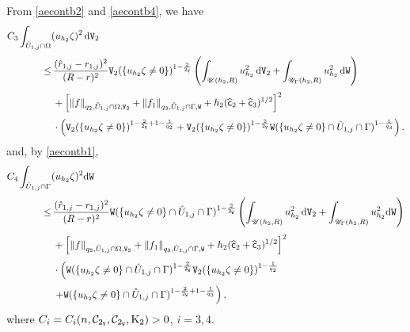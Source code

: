 \documentclass[reqno, 11pt, a4paper]{amsart}
\numberwithin{equation}{section}
\newcommand{\xv}{2_{\mathtt{V}}}
\newcommand{\xw}{2_{\mathtt{W}}}
\newcommand{\ck}{\textnormal K}
\newcommand{\fc}{\mathsf c}
\newcommand{\wghtv}{\mathtt{V}}
\newcommand{\wghtw}{\mathtt{W}}
\newcommand{\dwv}{\textnormal{d} \mathtt{V}}
\newcommand{\dww}{\textnormal{d} \mathtt{W}}
\begin{document}
From   \eqref{aecontb2} and   \eqref{aecontb4}, we have
\begin{equation}\label{aecontb6}
\begin{split} 
C_{3} \int   _{\hat U _{1,j} \cap \Omega } &    (u_{h_{2}}  \zeta )^2 \, \dwv _{2}   \\[3pt]
 \leq & \displaystyle \,    \frac{ (\hat r _{1,j} - r_{1,j})^2}{(R-r) ^{2}} \wghtv _2 ( \{u_{h_{2}}  \zeta \neq 0\})^{1- \frac{2}{\xv}}  \left( \int _{\mathscr{U}(h_{2},R)} u_{h_{2}}  ^2 \, \dwv _{2}    + \int _{\mathscr{U} _{\Gamma } (h_{2},R)}  u_{h_{2}}  ^2 \, \dww   \right)   \\[3pt]
 & \displaystyle \, + \left[  \Vert f \Vert _{q_2 , \hat U _{1,j} \cap \Omega  , \wghtv _2 } + \Vert f_1 \Vert _{q_3 , \hat U _{1,j} \cap \Gamma , \wghtw } + h_{2} (\widehat{\fc}_2+\widehat{\fc}_3 )^{1/2} \right]^2 \\[3pt]
& \displaystyle \,  \cdot   \left( \wghtv _2 ( \{u_{h_{2}}  \zeta \neq 0\})^{1- \frac{2}{\xv} + 1 -\frac{1}{q_2} }  + \wghtv _2 ( \{u_{h_{2}}  \zeta \neq 0\})^{1- \frac{2}{\xv}}  \wghtw  ( \{ u_{h_{2}}  \zeta \neq 0\}\cap \hat U _{1,j} \cap \Gamma )^{1-\frac{1}{q_3}} \right) .
\end{split}
\end{equation}
and, by \eqref{aecontb1},
\begin{equation}\label{aecontb7}
\begin{split}
C_{4} \int _{\hat U _{1,j} \cap \Gamma } & ( u_{h_{2}}  \zeta)^2   \dww   \\[3pt]
 \leq & \displaystyle \,    \frac{ (\hat r _{1,j} - r_{1,j})^2}{(R-r) ^{2}}    \wghtw  ( \{ u_{h_{2}}  \zeta \neq 0\} \cap \hat U _{1,j} \cap \Gamma )^{1 - \frac{2}{\xw}} \left( \int _{\mathscr{U} (h_{2}, R )} u_{h_{2}}  ^2  \, \dwv _{2}   + \int _{\mathscr{U}_{\Gamma } (h_{2},R)} u_{h_{2}}  ^2  \dww   \right)       \\[3pt]
& \displaystyle \, + \left[  \Vert f \Vert _{q _2 , \hat U _{1,j} \cap \Omega   , \wghtv _2} +  \Vert f_1 \Vert _{q_3 , \hat U _{1,j} \cap \Gamma , \wghtw}  + h_{2} (\widehat{\fc}_2+\widehat{\fc}_3 )^{1/2}\right]^2 \\[3pt]
& \displaystyle \, \cdot  \left(\wghtw  (\{ u_{h_{2}}  \zeta \neq 0\} \cap \hat U _{1,j} \cap \Gamma )^{1 - \frac{2}{\xw}}  \wghtv _{2}  (\{u_{h_{2}}  \zeta \neq 0\} )^{1 -\frac{1}{q_2}}   \right. \\[3pt]
& \displaystyle \, \left. +   \wghtw  ( \{ u_{h_{2}}  \zeta \neq 0\} \cap \hat U _{1,j} \cap \Gamma )^{1 - \frac{2}{\xw}+ 1 -\frac{1}{q_3}} \right) ,
 \end{split}
\end{equation}
where $C_i = C_i (  n , \mathcal C_{\xv} , \mathcal C_{\xw} , \ck _{2} )>0$, $i=3, 4$.
\end{document}
